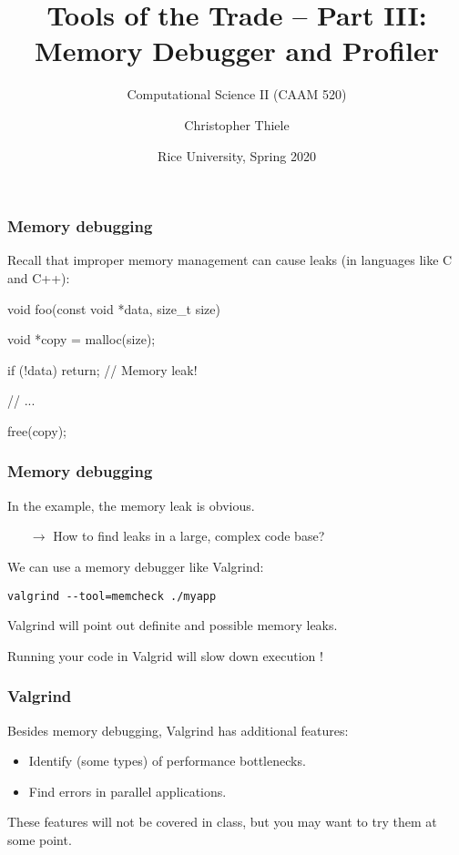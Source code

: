\documentclass[12pt,t]{beamer}
\let\emph\relax %
\newcommand{\conclude}[1]{%
  \begin{itemize}
    \item[$\rightarrow$]#1
  \end{itemize}
}
\newcommand{\cmd}[1]{\begin{center}\texttt{#1}\end{center}}
\begin{document}
  \title{Tools of the Trade -- Part III:\\Memory Debugger and Profiler}
  \subtitle{Computational Science II (CAAM 520)}
  \author{Christopher Thiele}
  \date{Rice University, Spring 2020}

  \begin{frame}
    \titlepage
  \end{frame}


  \begin{frame}[fragile]
    \frametitle{Memory debugging}

    Recall that improper memory management can cause leaks (in languages like C and C++):
    \begin{code}
void foo(const void *data, size_t size)
{
  void *copy = malloc(size);

  if (!data) {
    return; // Memory leak!
  }

  // ...

  free(copy);
}
    \end{code}
  \end{frame}

  \begin{frame}[fragile]
    \frametitle{Memory debugging}

    In the example, the memory leak is obvious.
    \conclude{How to find leaks in a large, complex code base?}

    We can use a memory debugger like Valgrind:
    \cmd{valgrind {-}-tool=memcheck ./myapp}

    Valgrind will point out definite and possible memory leaks.

    \emph{Note:} Running your code in Valgrid will slow down execution \emph{significantly}!
  \end{frame}

  \begin{frame}[fragile]
    \frametitle{Valgrind}

    Besides memory debugging, Valgrind has additional features:
    \begin{itemize}
      \item Identify (some types) of performance bottlenecks.
      \item Find errors in parallel applications.
    \end{itemize}

    These features will not be covered in class, but you may want to try them at some point.
  \end{frame}
\end{document}
